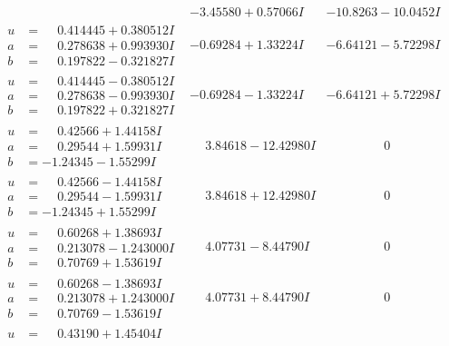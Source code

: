 \documentclass[1p]{elsarticle_modified}
\theoremstyle{definition}
\begin{document}
$$\begin{array}{c|c|c}
 & -3.45580 + 0.57066 I & -10.8263 - 10.0452 I \\ \hline\begin{aligned}
u &= \phantom{-}0.414445 + 0.380512 I \\
a &= \phantom{-}0.278638 + 0.993930 I \\
b &= \phantom{-}0.197822 - 0.321827 I\end{aligned}
 & -0.69284 + 1.33224 I & -6.64121 - 5.72298 I \\ \hline\begin{aligned}
u &= \phantom{-}0.414445 - 0.380512 I \\
a &= \phantom{-}0.278638 - 0.993930 I \\
b &= \phantom{-}0.197822 + 0.321827 I\end{aligned}
 & -0.69284 - 1.33224 I & -6.64121 + 5.72298 I \\ \hline\begin{aligned}
u &= \phantom{-}0.42566 + 1.44158 I \\
a &= \phantom{-}0.29544 + 1.59931 I \\
b &= -1.24345 - 1.55299 I\end{aligned}
 & \phantom{-}3.84618 - 12.42980 I & \phantom{-0.000000 } 0 \\ \hline\begin{aligned}
u &= \phantom{-}0.42566 - 1.44158 I \\
a &= \phantom{-}0.29544 - 1.59931 I \\
b &= -1.24345 + 1.55299 I\end{aligned}
 & \phantom{-}3.84618 + 12.42980 I & \phantom{-0.000000 } 0 \\ \hline\begin{aligned}
u &= \phantom{-}0.60268 + 1.38693 I \\
a &= \phantom{-}0.213078 - 1.243000 I \\
b &= \phantom{-}0.70769 + 1.53619 I\end{aligned}
 & \phantom{-}4.07731 - 8.44790 I & \phantom{-0.000000 } 0 \\ \hline\begin{aligned}
u &= \phantom{-}0.60268 - 1.38693 I \\
a &= \phantom{-}0.213078 + 1.243000 I \\
b &= \phantom{-}0.70769 - 1.53619 I\end{aligned}
 & \phantom{-}4.07731 + 8.44790 I & \phantom{-0.000000 } 0 \\ \hline\begin{aligned}
u &= \phantom{-}0.43190 + 1.45404 I \\

\end{aligned}
\end{array}$$
\end{document}
